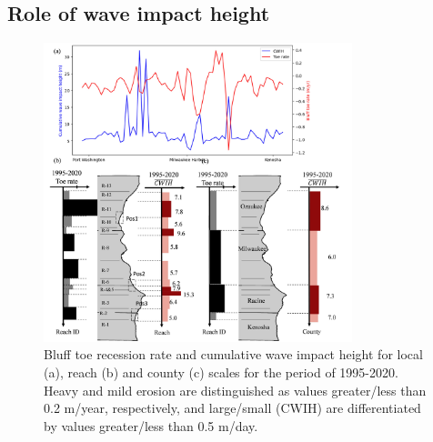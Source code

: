 \subsection{Role of wave impact height} 
\label{Role of wave impact height}

\begin{figure}[htbp]
\centering
\includegraphics[width=0.8\textwidth]{chapter2/resources/figure2-7.jpg}
\caption{Bluff toe recession rate and cumulative wave impact height for local
(a), reach (b) and county (c) scales for the period of 1995-2020. Heavy and mild
erosion are distinguished as values greater/less than 0.2 m/year, respectively,
and large/small (CWIH) are differentiated by values greater/less than 0.5
m/day.} 
\label{fig:fig2.7} 
\end{figure}

